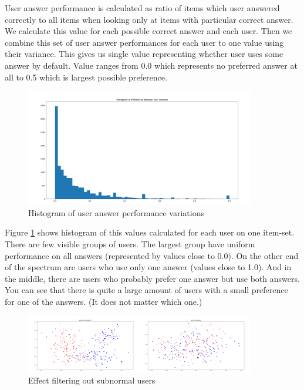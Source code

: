 \documentclass[
  digital, %
  table,   %
  nolof,     %
  nolot,     %
  nocover
]{fithesis3}
\begin{document}
User answer performance is calculated as ratio of items which user answered correctly to all items when looking only at items with particular correct answer. We calculate this value for each possible correct answer and each user. Then we combine this set of user answer performances for each user to one value using their variance. This gives us single value representing whether user uses some answer by default. Value ranges from 0.0 which represents no preferred answer at all to 0.5 which is largest possible preference.

\begin{figure}
  \includegraphics[width=10cm]{img/uneven_answers_hist}
  \caption{Histogram of user answer performance variations}
  \label{fig:uneven_answers_hist}
\end{figure}

Figure \ref{fig:uneven_answers_hist} shows histogram of this values calculated for each user on one item-set. There are few visible groups of users. The largest group have uniform performance on all answers (represented by values close to 0.0). On the other end of the spectrum are users who use only one answer (values close to 1.0). And in the middle, there are users who probably prefer one answer but use both answers. You can see that there is quite a large amount of users with a small preference for one of the answers. (It does not matter which one.)

\begin{figure}
  \includegraphics[width=10cm]{img/answers_normalization}
  \caption{Effect filtering out subnormal users}
  \label{fig:answers_normalization}
\end{figure}

\end{document}
